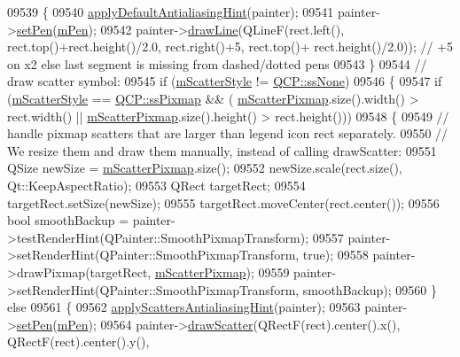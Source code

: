 \begin{DoxyCode}
09539   \{
09540     \hyperlink{a00024_a76e9d6cc7972dc1528f526d163766aca}{applyDefaultAntialiasingHint}(painter);
09541     painter->\hyperlink{a00047_af9c7a4cd1791403901f8c5b82a150195}{setPen}(\hyperlink{a00024_a67bc0622fd1b9fa14e54c14922dcec66}{mPen});
09542     painter->\hyperlink{a00047_a0b4b1b9bd495e182c731774dc800e6e0}{drawLine}(QLineF(rect.left(), rect.top()+rect.height()/2.0, rect.right()+5, rect.top()+
      rect.height()/2.0)); \textcolor{comment}{// +5 on x2 else last segment is missing from dashed/dotted pens}
09543   \}
09544   \textcolor{comment}{// draw scatter symbol:}
09545   \textcolor{keywordflow}{if} (\hyperlink{a00028_a5700a112cb679dc983648f67151d5cae}{mScatterStyle} != \hyperlink{a00143_af66d0711d42fe78d96c28abadc67f26fa3ee9f603bc4623e9b98011e8829aad1d}{QCP::ssNone})
09546   \{
09547     \textcolor{keywordflow}{if} (\hyperlink{a00028_a5700a112cb679dc983648f67151d5cae}{mScatterStyle} == \hyperlink{a00143_af66d0711d42fe78d96c28abadc67f26fa3046d385199d0903dd492322ba133e75}{QCP::ssPixmap} && (
      \hyperlink{a00028_a04103a65b13b2218265e74c567a7061e}{mScatterPixmap}.size().width() > rect.width() || \hyperlink{a00028_a04103a65b13b2218265e74c567a7061e}{mScatterPixmap}.size().height() 
      > rect.height()))
09548     \{
09549       \textcolor{comment}{// handle pixmap scatters that are larger than legend icon rect separately.}
09550       \textcolor{comment}{// We resize them and draw them manually, instead of calling drawScatter:}
09551       QSize newSize = \hyperlink{a00028_a04103a65b13b2218265e74c567a7061e}{mScatterPixmap}.size();
09552       newSize.scale(rect.size(), Qt::KeepAspectRatio);
09553       QRect targetRect;
09554       targetRect.setSize(newSize);
09555       targetRect.moveCenter(rect.center());
09556       \textcolor{keywordtype}{bool} smoothBackup = painter->testRenderHint(QPainter::SmoothPixmapTransform);
09557       painter->setRenderHint(QPainter::SmoothPixmapTransform, \textcolor{keyword}{true});
09558       painter->drawPixmap(targetRect, \hyperlink{a00028_a04103a65b13b2218265e74c567a7061e}{mScatterPixmap});
09559       painter->setRenderHint(QPainter::SmoothPixmapTransform, smoothBackup);
09560     \} \textcolor{keywordflow}{else}
09561     \{
09562       \hyperlink{a00024_a753272ee225a62827e90c3e1e78de4b1}{applyScattersAntialiasingHint}(painter);
09563       painter->\hyperlink{a00047_af9c7a4cd1791403901f8c5b82a150195}{setPen}(\hyperlink{a00024_a67bc0622fd1b9fa14e54c14922dcec66}{mPen});
09564       painter->\hyperlink{a00047_a3aa145eb9865752d583c40ef995c5049}{drawScatter}(QRectF(rect).center().x(), QRectF(rect).center().y(), 

\end{DoxyCode}
